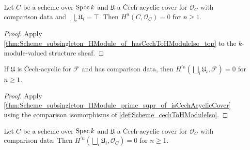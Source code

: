 \begin{theorem}\leanok
  \label{thm:Scheme_subsingleton_HModule_of_hasCechToHModuleIso_top_curve}

  Let \(C\) be a scheme over \(\operatorname{Spec} k\) and \(\mathfrak U\) a \v{C}ech-acyclic cover for \(\mathcal O_C\) with comparison data and \(\bigsqcup_i\mathfrak U_i=\top\). Then \(H^n(C,\mathcal O_C)=0\) for \(n\geq1\).
\end{theorem}

\begin{proof}


\leanok
  Apply \cref{thm:Scheme_subsingleton_HModule_of_hasCechToHModuleIso_top} to the \(k\)-module-valued structure sheaf.
\end{proof}

\begin{theorem}\leanok
  \label{thm:Scheme_subsingleton_HModule_prime_supr_of_hasCechToHModuleIso}

  If \(\mathfrak U\) is \v{C}ech-acyclic for \(\mathcal F\) and has comparison data, then \(H^{\prime n}(\bigsqcup_i\mathfrak U_i,\mathcal F)=0\) for \(n\geq1\).
\end{theorem}

\begin{proof}


\leanok
  Apply \cref{thm:Scheme_subsingleton_HModule_prime_supr_of_isCechAcyclicCover} using the comparison isomorphisms of \cref{def:Scheme_cechToHModuleIso}.
\end{proof}

\begin{theorem}\leanok
  \label{thm:Scheme_subsingleton_HModule_prime_supr_of_hasCechToHModuleIso_curve}

  Let \(C\) be a scheme over \(\operatorname{Spec} k\) and \(\mathfrak U\) a \v{C}ech-acyclic cover for \(\mathcal O_C\) with comparison data. Then \(H^{\prime n}(\bigsqcup_i\mathfrak U_i,\mathcal O_C)=0\) for \(n\geq1\).
\end{theorem}

